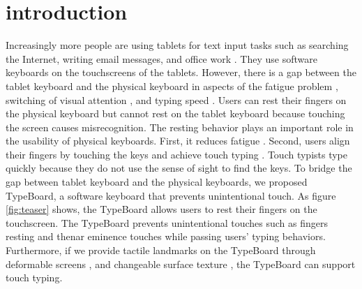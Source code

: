 \section{introduction}


Increasingly more people are using tablets for text input tasks such as searching the Internet, writing email messages, and office work \cite{2018-Japanese}. They use software keyboards on the touchscreens of the tablets. However, there is a gap between the tablet keyboard and the physical keyboard in aspects of the fatigue problem \cite{2014-Differences}, switching of visual attention \cite{2017-BlindType, 2010-NoLook, 2010-Eyes}, and typing speed \cite{1991-Improving, 2011-Typing}. Users can rest their fingers on the physical keyboard but cannot rest on the tablet keyboard because touching the screen causes misrecognition. The resting behavior plays an important role in the usability of physical keyboards. First, it reduces fatigue \cite{2013-TapBoard}. Second, users align their fingers by touching the keys and achieve touch typing \cite{2010-Warning, 1995-Use, 2011-Hierarchical, 2015-Haptic}. Touch typists type quickly because they do not use the sense of sight to find the keys. To bridge the gap between tablet keyboard and the physical keyboards, we proposed TypeBoard, a software keyboard that prevents unintentional touch. As figure \ref{fig:teaser} shows, the TypeBoard allows users to rest their fingers on the touchscreen. The TypeBoard prevents unintentional touches such as fingers resting and thenar eminence touches while passing users' typing behaviors. Furthermore, if we provide tactile landmarks on the TypeBoard through deformable screens \cite{Website-Tactus}, and changeable surface texture \cite{2011-Stimtac, 2010-TeslaTouch, 2011-Enhancing}, the TypeBoard can support touch typing.

